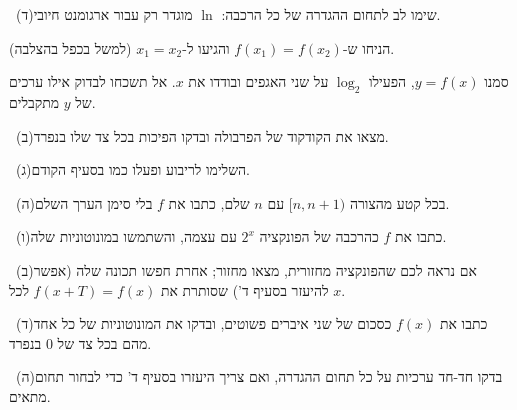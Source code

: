 \documentclass[12pt, a4paper]{article}
\begin{document}
\noindent {}\ (ד)\enskip שימו לב לתחום ההגדרה של כל הרכבה: $\ln$ מוגדר רק עבור ארגומנט חיובי.\par\smallskip
\noindent {}\enskip הניחו ש-$f(x_1)=f(x_2)$ והגיעו ל-$x_1=x_2$ (למשל בכפל בהצלבה).\par\smallskip
\noindent {}\enskip סמנו $y=f(x)$, הפעילו $\log_2$ על שני האגפים ובודדו את $x$. אל תשכחו לבדוק אילו ערכים של $y$ מתקבלים.\par\smallskip
\noindent {}\ (ב)\enskip מצאו את הקודקוד של הפרבולה ובדקו הפיכות בכל צד שלו בנפרד.\par\smallskip
\noindent {}\ (ג)\enskip השלימו לריבוע ופעלו כמו בסעיף הקודם.\par\smallskip
\noindent {}\ (ה)\enskip בכל קטע מהצורה $[n,n+1)$ עם $n$ שלם, כתבו את $f$ בלי סימן הערך השלם.\par\smallskip
\noindent {}\ (ו)\enskip כתבו את $f$ כהרכבה של הפונקציה $2^x$ עם עצמה, והשתמשו במונוטוניות שלה.\par\smallskip
\noindent {}\ (ב)\enskip אם נראה לכם שהפונקציה מחזורית, מצאו מחזור; אחרת חפשו תכונה שלה (אפשר להיעזר בסעיף ד') שסותרת את $f(x+T)=f(x)$ לכל $x$.\par\smallskip
\noindent {}\ (ד)\enskip כתבו את $f(x)$ כסכום של שני איברים פשוטים, ובדקו את המונוטוניות של כל אחד מהם בכל צד של $0$ בנפרד.\par\smallskip
\noindent {}\ (ה)\enskip בדקו חד-חד ערכיות על כל תחום ההגדרה, ואם צריך היעזרו בסעיף ד' כדי לבחור תחום מתאים.\par\smallskip
\end{document}
